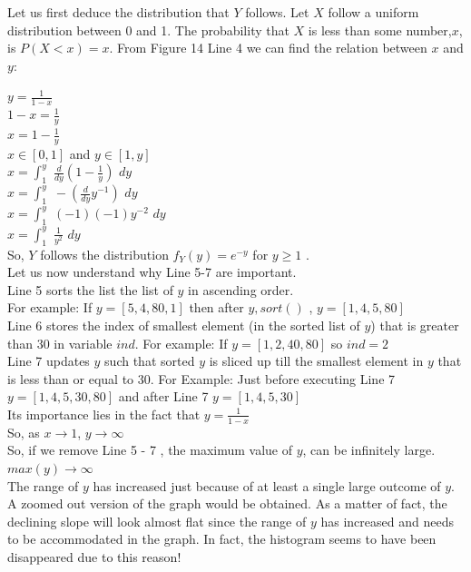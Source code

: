 \documentclass[answers]{exam}
\begin{document}
\begin{framed}
Let us first deduce the distribution that $Y$ follows. 
Let $X$ follow a uniform distribution between 0 and 1. The probability that $X$ is less than some number,$x$, is $P(X < x) = x$. From Figure 14 Line 4 we can find the relation between $x$ and $y$: 

$y = \frac{1}{1-x}$\\
    $1 - x = \frac{1}{y}$\\
    $x = 1 - \frac{1}{y}$\\
    $x \in [0, 1]$ and $y \in [1, y]$\\
    $x = \int^y_1 \, \, \frac{d}{dy} (1 - \frac{1}{y}) \, \, dy$\\
    $x = \int^y_1 \, \, - (\frac{d}{dy} y^{-1}) \, \, dy$\\
    $x = \int^y_1 \, \, (-1)(-1)y^{-2} \, \, dy$\\
    $x = \int^y_1 \, \, \frac{1}{y^2} \, \, dy$\\ 
    So, $Y$ follows the distribution $f_Y(y) = e^{-y}$ for $y \geq 1$ . \\
Let us now understand why Line 5-7 are important. \\
Line 5 sorts the list the list of $y$ in ascending order.  \\
For example: If $y = [ 5, 4, 80, 1 ]$ then after $y,sort()$ , $y = [1, 4, 5, 80]$ \\
Line 6 stores the index of smallest element (in the sorted list of $y$) that is greater than 30 in variable $ind$.
For example: If $y = [1, 2, 40, 80]$ so $ind = 2$\\
Line 7 updates $y$ such that sorted $y$ is sliced up till the smallest element in $y$ that is less than or equal to 30. For Example: Just before executing Line 7 $y = [1, 4, 5, 30, 80]$ and after Line 7 $y = [1, 4, 5, 30]$ \\
Its importance lies in the fact that $y = \frac{1}{1-x}$\\
So, as $x \rightarrow 1$, $y \rightarrow \infty$\\
So, if we remove Line 5 - 7 , the maximum value of $y$, can be infinitely large. \\
$max(y) \rightarrow \infty$\\
The range of $y$ has increased just because of at least a single large outcome of $y$. A zoomed out version of the graph would be obtained. As a matter of fact, the declining slope will look almost flat since the range of $y$ has increased and needs to be accommodated in the graph. In fact, the histogram seems to have been disappeared due to this reason! 

\end{framed}
\end{document}
